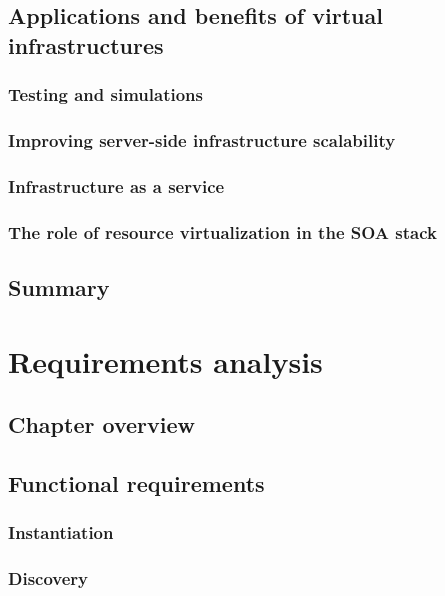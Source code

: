 \documentclass[11pt]{book}
\begin{document}
    \section{Applications and benefits of virtual infrastructures}

      \subsection{Testing and simulations}

      \subsection{Improving server-side infrastructure scalability}

      \subsection{Infrastructure as a service}

      \subsection{The role of resource virtualization in the SOA stack}


    \section{Summary}


  \chapter{Requirements analysis}
    
    \section{Chapter overview}

    \section{Functional requirements}

      \subsection{Instantiation}

      \subsection{Discovery}
\end{document}
